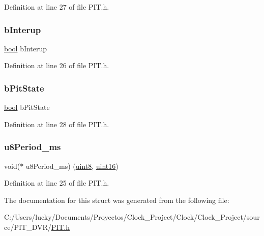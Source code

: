 Definition at line 27 of file P\+I\+T.\+h.

\mbox{\label{structtst_init_pit_a7818fb2979d6d3d3c27911297204c800}} 
\subsubsection{\texorpdfstring{bInterup}{bInterup}}
{\footnotesize\ttfamily \mbox{\hyperlink{_p_i_t_8h_abb452686968e48b67397da5f97445f5b}{bool}} b\+Interup}



Definition at line 26 of file P\+I\+T.\+h.

\mbox{\label{structtst_init_pit_a832f44d0b291d7ce1d051834a0d22e7e}} 
\subsubsection{\texorpdfstring{bPitState}{bPitState}}
{\footnotesize\ttfamily \mbox{\hyperlink{_p_i_t_8h_abb452686968e48b67397da5f97445f5b}{bool}} b\+Pit\+State}



Definition at line 28 of file P\+I\+T.\+h.

\mbox{\label{structtst_init_pit_a74832dd7d9dc2eae8d3c5e7844fb17c4}} 
\subsubsection{\texorpdfstring{u8Period\_ms}{u8Period\_ms}}
{\footnotesize\ttfamily void($\ast$ u8\+Period\+\_\+ms) (\mbox{\hyperlink{_p_i_t_8h_adde6aaee8457bee49c2a92621fe22b79}{uint8}}, \mbox{\hyperlink{_p_i_t_8h_a05f6b0ae8f6a6e135b0e290c25fe0e4e}{uint16}})}



Definition at line 25 of file P\+I\+T.\+h.



The documentation for this struct was generated from the following file\+:\begin{DoxyCompactItemize}
\item 
C\+:/\+Users/lucky/\+Documents/\+Proyectos/\+Clock\+\_\+\+Project/\+Clock/\+Clock\+\_\+\+Project/source/\+P\+I\+T\+\_\+\+D\+V\+R/\mbox{\hyperlink{_p_i_t_8h}{P\+I\+T.\+h}}\end{DoxyCompactItemize}
